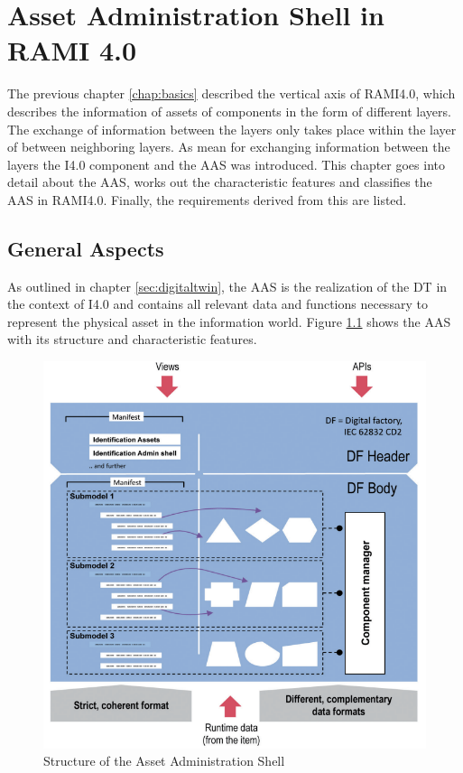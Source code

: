 \chapter{Asset Administration Shell in RAMI 4.0} \label{chap:aas-and-rami}
The previous chapter \ref{chap:basics} described the vertical axis of \ac{RAMI4.0}, which describes the information of assets of components in the form of different layers. The exchange of information between the layers only takes place within the layer of between neighboring layers. As mean for exchanging information between the layers the \ac{I4.0} component and the \ac{AAS} was introduced. This chapter goes into detail about the \ac{AAS}, works out the characteristic features and classifies the \ac{AAS} in \ac{RAMI4.0}. Finally, the requirements derived from this are listed.


\section{General Aspects} \label{sec:assetadministrationshell}
As outlined in chapter \ref{sec:digitaltwin}, the \ac{AAS} is the realization of the \ac{DT} in the context of \ac{I4.0} and contains all relevant data and functions necessary to represent the physical asset in the information world. Figure \ref{fig:structureaas} shows the \ac{AAS} with its structure and characteristic features.

\begin{figure}[h]
\centering
\includegraphics[scale=0.8]{content/pictures/structure_aas_zvei.png}
\caption{Structure of the Asset Administration Shell}
\label{fig:structureaas}
\end{figure}


